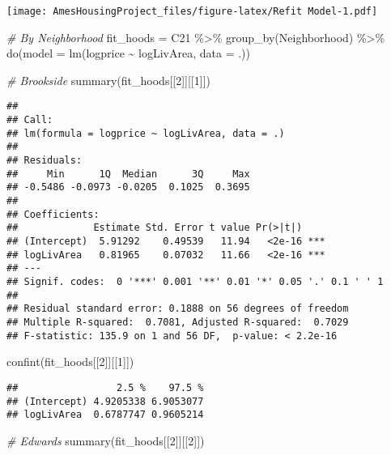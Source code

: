 \documentclass[
]{article}
\newenvironment{Shaded}{\begin{snugshade}}{\end{snugshade}}
\newcommand{\AttributeTok}[1]{\textcolor[rgb]{0.77,0.63,0.00}{#1}}
\newcommand{\CommentTok}[1]{\textcolor[rgb]{0.56,0.35,0.01}{\textit{#1}}}
\newcommand{\DecValTok}[1]{\textcolor[rgb]{0.00,0.00,0.81}{#1}}
\newcommand{\FunctionTok}[1]{\textcolor[rgb]{0.00,0.00,0.00}{#1}}
\newcommand{\NormalTok}[1]{#1}
\newcommand{\OtherTok}[1]{\textcolor[rgb]{0.56,0.35,0.01}{#1}}
\newcommand{\SpecialCharTok}[1]{\textcolor[rgb]{0.00,0.00,0.00}{#1}}
\begin{document}
\texttt{[image: AmesHousingProject\_files/figure-latex/Refit Model-1.pdf]}

\begin{Shaded}
\begin{Highlighting}[]
\CommentTok{\# By Neighborhood}
\NormalTok{fit\_hoods }\OtherTok{=}\NormalTok{ C21 }\SpecialCharTok{\%\textgreater{}\%} \FunctionTok{group\_by}\NormalTok{(Neighborhood) }\SpecialCharTok{\%\textgreater{}\%} \FunctionTok{do}\NormalTok{(}\AttributeTok{model =} \FunctionTok{lm}\NormalTok{(logprice }\SpecialCharTok{\textasciitilde{}}\NormalTok{ logLivArea, }\AttributeTok{data =}\NormalTok{ .))}

\CommentTok{\# Brookside}
\FunctionTok{summary}\NormalTok{(fit\_hoods[[}\DecValTok{2}\NormalTok{]][[}\DecValTok{1}\NormalTok{]])}
\end{Highlighting}
\end{Shaded}

\begin{verbatim}
## 
## Call:
## lm(formula = logprice ~ logLivArea, data = .)
## 
## Residuals:
##     Min      1Q  Median      3Q     Max 
## -0.5486 -0.0973 -0.0205  0.1025  0.3695 
## 
## Coefficients:
##             Estimate Std. Error t value Pr(>|t|)    
## (Intercept)  5.91292    0.49539   11.94   <2e-16 ***
## logLivArea   0.81965    0.07032   11.66   <2e-16 ***
## ---
## Signif. codes:  0 '***' 0.001 '**' 0.01 '*' 0.05 '.' 0.1 ' ' 1
## 
## Residual standard error: 0.1888 on 56 degrees of freedom
## Multiple R-squared:  0.7081, Adjusted R-squared:  0.7029 
## F-statistic: 135.9 on 1 and 56 DF,  p-value: < 2.2e-16
\end{verbatim}

\begin{Shaded}
\begin{Highlighting}[]
\FunctionTok{confint}\NormalTok{(fit\_hoods[[}\DecValTok{2}\NormalTok{]][[}\DecValTok{1}\NormalTok{]])}
\end{Highlighting}
\end{Shaded}

\begin{verbatim}
##                 2.5 %    97.5 %
## (Intercept) 4.9205338 6.9053077
## logLivArea  0.6787747 0.9605214
\end{verbatim}

\begin{Shaded}
\begin{Highlighting}[]
\CommentTok{\# Edwards}
\FunctionTok{summary}\NormalTok{(fit\_hoods[[}\DecValTok{2}\NormalTok{]][[}\DecValTok{2}\NormalTok{]])}
\end{Highlighting}
\end{Shaded}
\end{document}
